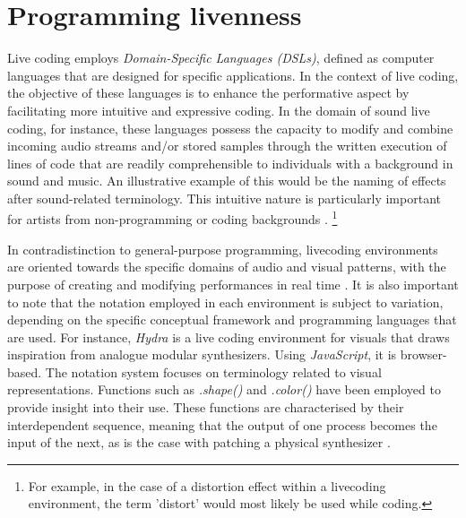 \documentclass[12pt, twoside, a4paper]{report}
\begin{document}
\section{Programming livenness}


Live coding employs \textit{Domain-Specific Languages (DSLs)}, defined as computer languages that are designed for specific applications. In the context of live coding, the objective of these languages is to enhance the performative aspect by facilitating more intuitive and expressive coding. In the domain of sound live coding, for instance, these languages possess the capacity to modify and combine incoming audio streams and/or stored samples through the written execution of lines of code that are readily comprehensible to individuals with a background in sound and music. 
An illustrative example of this would be the naming of effects after sound-related terminology. This intuitive nature is particularly important for artists from non-programming or coding backgrounds \citep{puckette2007theory}.
\footnote{For example, in the case of a distortion effect within a livecoding environment, the term 'distort' would most likely be used while coding.}

In contradistinction to general-purpose programming, livecoding environments are oriented towards the specific domains of audio and visual patterns, with the purpose of creating and modifying performances in real time \citep{Embed}.
It is also important to note that the notation employed in each environment is subject to variation, depending on the specific conceptual framework and programming languages that are used. For instance, \textit{Hydra} is a live coding environment for visuals that draws inspiration from analogue modular synthesizers. Using \textit{JavaScript}, it is browser-based. The notation system focuses on terminology related to visual representations. Functions such as \textit{.shape()} and \textit{.color()} have been employed to provide insight into their use. These functions are characterised by their interdependent sequence, meaning that the output of one process becomes the input of the next, as is the case with patching a physical synthesizer \citep{jack2019hydra}.
\end{document}

